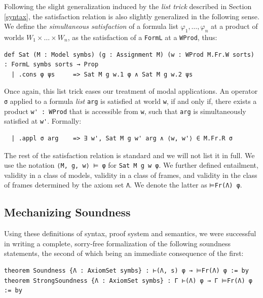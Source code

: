 \documentclass{easychair}
\theoremstyle{remark}
\begin{document}
Following the slight generalization induced by the \textit{list trick} described in Section \ref{syntax}, the satisfaction relation is also slightly generalized in the following sense. We define the \textit{simultaneous satisfaction} of a formula list $\varphi_1, \dots, \varphi_n$ at a product of worlds $W_1 \times \dots \times W_n$, as the satisfaction of a \lstinline{FormL} at a \lstinline{WProd}, thus:

\begin{lstlisting}
def Sat (M : Model symbs) (g : Assignment M) (w : WProd M.Fr.W sorts) : FormL symbs sorts → Prop
  | .cons φ ψs     => Sat M g w.1 φ ∧ Sat M g w.2 ψs
\end{lstlisting}

Once again, this list trick eases our treatment of modal applications. An operator \lstinline{σ} applied to a formula \textit{list} \lstinline{arg} is satisfied at world \lstinline{w}, if and only if, there exists a product \lstinline{w' : WProd} that is accessible from \lstinline{w}, such that \lstinline{arg} is simultaneously satisfied at \lstinline{w'}. Formally:
\begin{lstlisting}
  | .appl σ arg    => ∃ w', Sat M g w' arg ∧ ⟨w, w'⟩ ∈ M.Fr.R σ
\end{lstlisting}

The rest of the satisfaction relation is standard and we will not list it in full.
We use the notation \lstinline{⟨M, g, w⟩ ⊨ φ} for \lstinline{Sat M g w φ}. We further defined entailment, validity in a class of models, validity in a class of frames, and validity in the class of frames determined by the axiom set \lstinline{Λ}. We denote the latter as \lstinline{⊨Fr(Λ) φ}.

\subsection{Mechanizing Soundness}

Using these definitions of syntax, proof system and semantics, we were successful in writing a complete, sorry-free formalization of the following soundness statements, the second of which being an immediate consequence of the first:
\begin{lstlisting}
theorem Soundness {Λ : AxiomSet symbs} : ⊢(Λ, s) φ → ⊨Fr(Λ) φ := by
theorem StrongSoundness {Λ : AxiomSet symbs} : Γ ⊢(Λ) φ → Γ ⊨Fr(Λ) φ := by
\end{lstlisting}
\end{document}
